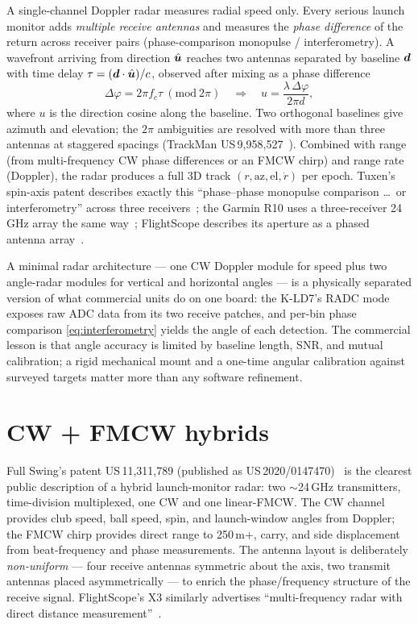 A single-channel Doppler radar measures radial speed only. Every serious
launch monitor adds \emph{multiple receive antennas} and measures the
\emph{phase difference} of the return across receiver pairs
(phase-comparison monopulse / interferometry). A wavefront arriving from
direction $\hat{\bm{u}}$ reaches two antennas separated by baseline $\bm{d}$
with time delay $\tau = (\bm{d}\cdot\hat{\bm{u}})/c$, observed after mixing
as a phase difference
\begin{equation}
\label{eq:interferometry}
\Delta\varphi = 2\pi f_c \tau \ (\mathrm{mod}\ 2\pi)
\quad\Longrightarrow\quad
u = \frac{\lambda\,\Delta\varphi}{2\pi d},
\end{equation}
where $u$ is the direction cosine along the baseline. Two orthogonal
baselines give azimuth and elevation; the $2\pi$ ambiguities are resolved
with more than three antennas at staggered spacings (TrackMan
US\,9,958,527~\cite{us12186643}). Combined with range (from
multi-frequency CW phase differences or an FMCW chirp) and range rate
(Doppler), the radar produces a full 3D track $(r,\mathrm{az},
\mathrm{el},\dot r)$ per epoch. Tuxen's spin-axis patent describes exactly
this ``phase--phase monopulse comparison \ldots\ or interferometry'' across
three receivers~\cite{us10850179}; the Garmin R10 uses a three-receiver
24\,GHz array the same way~\cite{garminr10data}; FlightScope describes its
aperture as a phased antenna array~\cite{flightscopex3}.

\begin{implication}
A minimal radar architecture --- one CW Doppler module for speed plus two angle-radar modules for
vertical and horizontal angles --- is a physically separated version of
what commercial units do on one board: the K-LD7's RADC mode exposes raw
ADC data from its two receive patches, and per-bin phase comparison
\cref{eq:interferometry} yields the angle of each detection. The
commercial lesson is that angle accuracy is limited by baseline length,
SNR, and mutual calibration; a rigid mechanical mount and a one-time
angular calibration against surveyed targets matter more than any software
refinement.
\end{implication}

\section{CW + FMCW hybrids}
\label{sec:fmcw}

Full Swing's patent US\,11,311,789 (published as
US\,2020/0147470)~\cite{fullswingpatent} is
the clearest public description of a hybrid launch-monitor radar: two
$\sim$24\,GHz transmitters, time-division multiplexed, one CW and one
linear-FMCW. The CW channel provides club speed, ball speed, spin, and
launch-window angles from Doppler; the FMCW chirp provides direct range to
250\,m+, carry, and side displacement from beat-frequency and phase
measurements. The antenna layout is deliberately \emph{non-uniform} ---
four receive antennas symmetric about the axis, two transmit antennas
placed asymmetrically --- to enrich the phase/frequency structure of the
receive signal. FlightScope's X3 similarly advertises ``multi-frequency
radar with direct distance measurement''~\cite{flightscopex3}.

